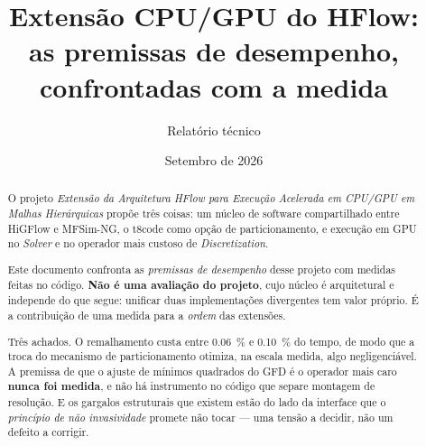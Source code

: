 \documentclass[11pt,a4paper]{article}
\title{Extens\~ao CPU/GPU do HFlow:\\
       as premissas de desempenho, confrontadas com a medida}
\author{Relat\'orio t\'ecnico}
\date{Setembro de 2026}
\begin{document}
\maketitle

\begin{abstract}
\sloppy
O projeto \emph{Extens\~ao da Arquitetura HFlow para Execu\c{c}\~ao Acelerada em
CPU/GPU em Malhas Hier\'arquicas} prop\~oe tr\^es coisas: um n\'ucleo de software
compartilhado entre HiGFlow e MFSim-NG, o t8code como op\c{c}\~ao de
particionamento, e execu\c{c}\~ao em GPU no \emph{Solver} e no operador mais
custoso de \emph{Discretization}.

Este documento confronta as \emph{premissas de desempenho} desse projeto com
medidas feitas no c\'odigo. \textbf{N\~ao \'e uma avalia\c{c}\~ao do projeto},
cujo n\'ucleo \'e arquitetural e independe do que segue: unificar duas
implementa\c{c}\~oes divergentes tem valor pr\'oprio. \'E a contribui\c{c}\~ao de
uma medida para a \emph{ordem} das extens\~oes.

Tr\^es achados. O remalhamento custa entre \SI{0.06}{\percent} e
\SI{0.10}{\percent} do tempo, de modo que a troca do mecanismo de
particionamento otimiza, na escala medida, algo negligenci\'avel. A premissa de
que o ajuste de m\'inimos quadrados do GFD \'e o operador mais caro
\textbf{nunca foi medida}, e n\~ao h\'a instrumento no c\'odigo que separe
montagem de resolu\c{c}\~ao. E os gargalos estruturais que existem est\~ao do lado
da interface que o \emph{princ\'ipio de n\~ao invasividade} promete n\~ao tocar
--- uma tens\~ao a decidir, n\~ao um defeito a corrigir.
\end{abstract}

\tableofcontents




\end{document}
